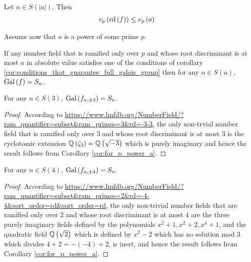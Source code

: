 \documentclass[../main.tex]{subfiles}
\begin{document}
\begin{corollary}
  Let $n \in S\left( \left| a \right| \right)$.
  Then 
  \[
    v_p\left( \operatorname{\rm rd}\left( f \right) \right) \leq v_p\left( a \right)
  \]
\end{corollary}
Assume now that $a$ is a power of some prime $p$.
\begin{corollary}
  \label{cor:for_p_power_a} 
  If any number field that is ramified only over $p$ and whose root discriminant is at most $a$ in absolute value satisfies one of the conditions of corollary \ref{cor:conditions_that_guarantee_full_galois_group} then for any $n \in S\left( a \right)$, $\operatorname{Gal}\left( f \right) = S_n$.
\end{corollary}

\begin{corollary}
  For any $n \in S\left( 3 \right)$, $\operatorname{Gal}\left( f_{n,\pm3} \right) = S_n$.  
\end{corollary}
\begin{proof}
  According to \url{https://www.lmfdb.org/NumberField/?ram_quantifier=subset&ram_primes=3&rd=-3-3}, the only non-trvial number field that is ramified only over $3$ and whose root discriminant is at most $3$ is the cyclotomic extension $\mathbb{Q}\left( \zeta_3 \right) = \mathbb{Q}\left( \sqrt{-3} \right)$ which is purely imaginary and hence the result follows from Corollary \ref{cor:for_p_power_a}.
\end{proof}

\begin{corollary}
  For any $n \in S\left( 4 \right)$, $\operatorname{Gal}\left( f_{n,\pm4} \right) = S_n$.
\end{corollary}
\begin{proof}
  According to \url{https://www.lmfdb.org/NumberField/?ram_quantifier=subset&ram_primes=2&rd=-4-4&sort_order=rd&sort_order=rd}, the only non-trivial number fields that are ramified only over $2$ and whose root discriminant is at most $4$ are the three purely imaginary fields defined by the polynomials $x^2 + 1, x^2 + 2, x^4 + 1$, and the quadratic field $\mathbb{Q}\left( \sqrt{2} \right)$ which is defined by $x^2 -2$ which has no solution mod $3$ which divides $4 + 2 = -\left( -4 \right) + 2$, is inert, and hence the result follows from Corollary \ref{cor:for_p_power_a}.
\end{proof}
\end{document}
